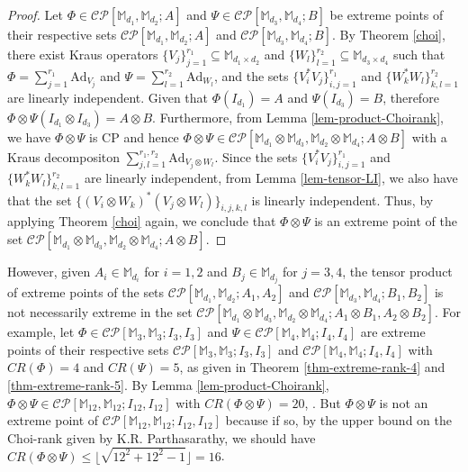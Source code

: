 \documentclass[10pt,reqno]{amsart}
\theoremstyle{definition}
\theoremstyle{plain}
\theoremstyle{remark}
\newcommand{\mbb}[1]{\mathbb{#1}}
\newcommand{\msc}[1]{\mathscr{#1}}
\newcommand{\M}[1]{\mbb{M}_{#1}}%
\numberwithin{equation}{section}%
\begin{document}
   
   \begin{proof}
   	Let $\Phi \in \msc{CP}[\M{d_1}, \M{d_2}; A]$ and $\Psi \in \msc{CP}[\M{d_3}, \M{d_4}; B]$ be extreme points of their respective sets $\msc{CP}[\M{d_1}, \M{d_2}; A]$ and $\msc{CP}[\M{d_3}, \M{d_4}; B]$. By Theorem \ref{choi}, there exist Kraus operators $\{V_j\}_{j=1}^{r_1}\subseteq\M{d_1 \times d_2}$ and $\{W_l\}_{l=1}^{r_2} \subseteq\M{d_3 \times d_4}$ such that $\Phi = \sum_{j=1}^{r_1} \mathrm{Ad}_{V_j}$ and $\Psi = \sum_{l=1}^{r_2} \mathrm{Ad}_{W_l}$, and the sets $\{V_i^*V_j\}_{i,j=1}^{r_1}$ and $\{W_k^*W_l\}_{k,l=1}^{r_2}$ are linearly independent. Given that $\Phi(I_{d_1}) = A$ and $\Psi(I_{d_3}) = B$, therefore $\Phi \otimes \Psi(I_{d_1} \otimes I_{d_3}) = A \otimes B$. Furthermore, from Lemma \ref{lem-product-Choirank}, we have $\Phi \otimes \Psi$ is CP and  hence $\Phi \otimes \Psi \in \msc{CP}[\M{d_1} \otimes \M{d_3}, \M{d_2} \otimes \M{d_4}; A \otimes B]$ with a Kraus decompositon $\sum_{j,l=1}^{r_1,r_2} \mathrm{Ad}_{V_j \otimes W_l}$. Since the sets $\{V_i^*V_j\}_{i,j=1}^{r_1}$ and $\{W_k^*W_l\}_{k,l=1}^{r_2}$ are linearly independent, from Lemma \ref{lem-tensor-LI}, we also have that the set $\{(V_i \otimes W_k)^*(V_j \otimes W_l)\}_{i,j,k,l}$ is linearly independent. Thus, by applying Theorem \ref{choi} again, we conclude that $\Phi \otimes \Psi$ is an extreme point of the set $\msc{CP}[\M{d_1} \otimes \M{d_3}, \M{d_2} \otimes \M{d_4}; A \otimes B]$.
   \end{proof}
   
   
   
   However, given $A_i\in\M{d_i}$ for $i=1,2$ and $B_j\in\M{d_j}$ for $j=3,4$, the tensor product of extreme points of the sets $\msc{CP}[\M{d_1},\M{d_2}; A_1,A_2]$ and $\msc{CP}[\M{d_3},\M{d_4}; B_1,B_2]$ is not necessarily extreme in the set $\msc{CP}[\M{d_1}\otimes\M{d_3},\M{d_2}\otimes\M{d_4}; A_1\otimes B_1,A_2\otimes B_2]$. For example, let $\Phi\in\msc{CP}[\M{3},\M{3}; I_3,I_3]$ and $\Psi\in\msc{CP}[\M{4},\M{4}; I_4,I_4]$ are extreme points of their respective sets $\msc{CP}[\M{3},\M{3}; I_3,I_3]$ and $\msc{CP}[\M{4},\M{4}; I_4,I_4]$ with $CR(\Phi)=4$ and $CR(\Psi)=5$, as given in Theorem \ref{thm-extreme-rank-4} and \ref{thm-extreme-rank-5}. By Lemma \ref{lem-product-Choirank}, $\Phi\otimes\Psi\in \msc{CP}[\M{12},\M{12}; I_{12},I_{12}]$ with $CR(\Phi\otimes\Psi)=20$, . But $\Phi\otimes\Psi$ is not an extreme point of $\msc{CP}[\M{12},\M{12}; I_{12},I_{12}]$ because if so, by the upper bound on the Choi-rank given by K.R. Parthasarathy, we should have $CR(\Phi\otimes\Psi)\leq\lfloor{\sqrt{{12}^2+{12}^2-1}}\rfloor=16$. 
   
\end{document}
